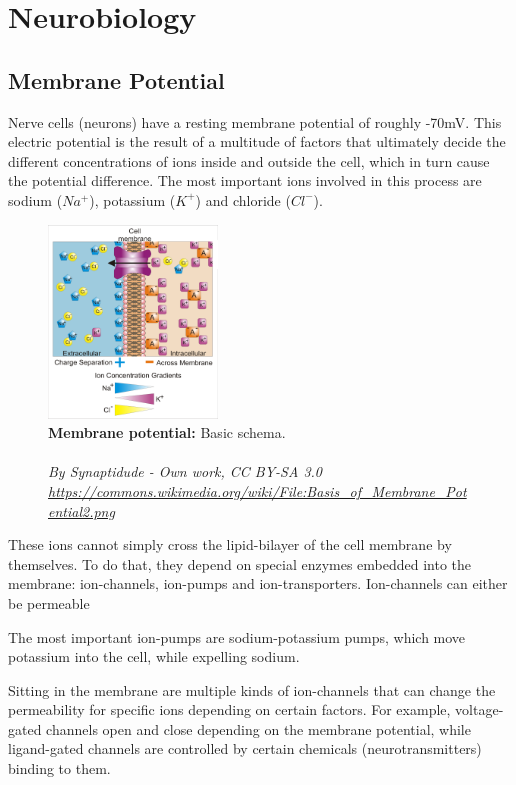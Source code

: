 \section{Neurobiology}\label{sec:neurobiology}
\qquad {}
\subsection{Membrane Potential}\label{subsec:membrane-potential}
Nerve cells (neurons) have a resting membrane potential of roughly -70mV.
This electric potential is the result of a multitude of factors that ultimately decide the
different concentrations of ions inside and outside the cell, which in turn cause the potential difference.
The most important ions involved in this process are sodium ($Na^+$), potassium ($K^+$) and chloride ($Cl^-$).
\begin{figure}
		\centering
		\includegraphics[width=0.40\textwidth]{Figures/neurobiology/membrane_potential}
		\caption{\textbf{Membrane potential:} Basic schema. \\
        \hrulefill \\
        \textit{By Synaptidude - Own work, CC BY-SA 3.0
        \url{https://commons.wikimedia.org/wiki/File:Basis_of_Membrane_Potential2.png} } }
		\label{fig:MembranePotential}
\end{figure}
These ions cannot simply cross the lipid-bilayer of the cell membrane by themselves.
To do that, they depend on special enzymes embedded into the membrane: ion-channels, ion-pumps and ion-transporters.
Ion-channels can either be permeable 

The most important ion-pumps are sodium-potassium pumps, which move potassium into the cell, while expelling sodium.

Sitting in the membrane are multiple kinds of ion-channels that can change the permeability for
specific ions depending on certain factors.
For example, voltage-gated channels open and close depending on the membrane potential,
while ligand-gated channels are controlled by certain chemicals (neurotransmitters) binding to them.



